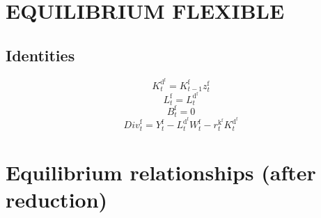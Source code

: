 \section{EQUILIBRIUM FLEXIBLE}

\subsection{Identities}

\begin{equation}
K^{\mathrm{d}^{\mathrm{f}}}_{t} = {K^{\mathrm{f}}_{t-1}} {z^{\mathrm{f}}_{t}}
\end{equation}
\begin{equation}
L^{\mathrm{f}}_{t} = L^{\mathrm{d}^{\mathrm{f}}}_{t}
\end{equation}
\begin{equation}
B^{\mathrm{f}}_{t} = 0
\end{equation}
\begin{equation}
{D\!i\!v}^{\mathrm{f}}_{t} = Y^{\mathrm{f}}_{t} - {L^{\mathrm{d}^{\mathrm{f}}}_{t}} {W^{\mathrm{f}}_{t}} - {r^{\mathrm{k}^{\mathrm{f}}}_{t}} {K^{\mathrm{d}^{\mathrm{f}}}_{t}}
\end{equation}




\section{Equilibrium relationships (after reduction)}

